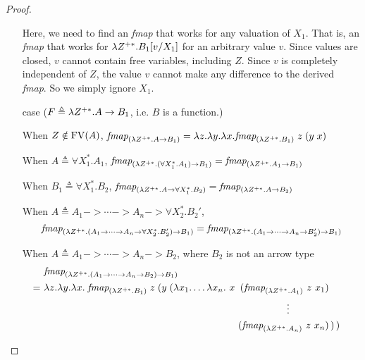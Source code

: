 \begin{proof}
\begin{itemize}
        Here, we need to find an \textit{fmap}
        that works for any valuation of $X_1$.
        That is, an \textit{fmap} that works for $\lambda Z^{+*}. B_1[v/X_1]$
        for an arbitrary value $v$. Since values are closed, $v$
        cannot contain free variables, including $Z$. Since $v$
        is completely independent of $Z$, the value $v$ cannot make any
        difference to the derived \textit{fmap}. So we simply ignore $X_1$.

\item[case]($F \triangleq \lambda Z^{+*}. A -> B_1$, i.e. $B$ is a function.)

        When $Z\notin\mathop{\mathrm{FV}}(A)$,
        $\textit{fmap}_{(\lambda Z^{+*}.A -> B_1)}
        = \lambda z.\lambda y. \lambda x. \textit{fmap}_{(\lambda Z^{+*}.B_1)} \; z \; (y \; x)$

        When $A \triangleq \forall X_1^{*}.A_1$,
        $\textit{fmap}_{(\lambda Z^{+*}.(\forall X_1^{*}.A_1) -> B_1)}
        = \textit{fmap}_{(\lambda Z^{+*}.A_1 -> B_1)}$
        
        When $B_1 \triangleq \forall X_1^{*}.B_2$,
        $\textit{fmap}_{(\lambda Z^{+*}.A -> \forall X_1^{*}.B_2)}
        = \textit{fmap}_{(\lambda Z^{+*}.A -> B_2)}$        

        \begin{singlespace}
        When $A \triangleq A_1 -> \cdots -> A_n -> \forall X_2^{*}.B_2'$,
        \vspace{-1.5ex}
        \[\textit{fmap}_{(\lambda Z^{+*}.(A_1 -> \cdots -> A_n -> \forall X_2^{*}.B_2') -> B_1)}
        = \textit{fmap}_{(\lambda Z^{+*}.(A_1 -> \cdots -> A_n -> B_2') -> B_1)} \]

        When $A \triangleq A_1 -> \cdots -> A_n -> B_2$,
        where $B_2$ is not an arrow type
        \vspace{-1.5ex}
        \begin{align*}
          & \textit{fmap}_{(\l Z^{+*}.(A_1 -> \cdots -> A_n -> B_2) -> B_1)} \\
        =~& \l z.\l y. \l x.\;
        \textit{fmap}_{(\l Z^{+*}.B_1)} \; z \;
                (y \; (\l x_1.\ldots\l x_n. ~
                   x  &\!\!\!\!(\textit{fmap}_{(\l Z^{+*}.A_1)} ~ z ~ x_1)& \\
                     &&\!\!\!\!\vdots \qquad\qquad& \\
                     &&\!\!\!\!(\textit{fmap}_{(\l Z^{+*}.A_n)} ~ z ~ x_n)&
                \,) \,)
        \end{align*}
        \end{singlespace}

\end{itemize}
\end{proof}

